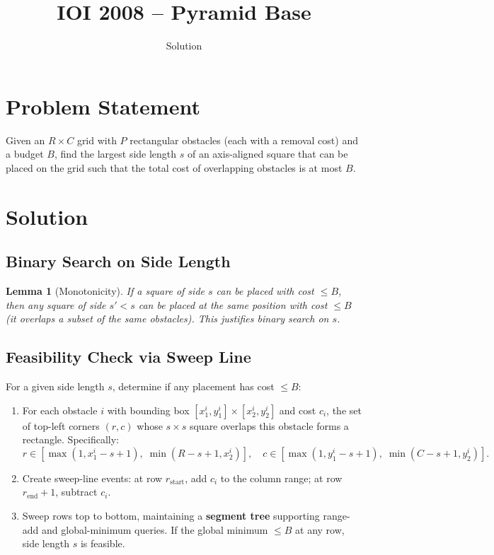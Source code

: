 \documentclass[11pt,a4paper]{article}
\title{IOI 2008 -- Pyramid Base}
\author{Solution}
\date{}
\newtheorem{lemma}[theorem]{Lemma}
\begin{document}
\maketitle

\section{Problem Statement}
Given an $R \times C$ grid with $P$ rectangular obstacles (each with a removal cost) and a budget $B$, find the largest side length $s$ of an axis-aligned square that can be placed on the grid such that the total cost of overlapping obstacles is at most $B$.

\section{Solution}

\subsection{Binary Search on Side Length}
\begin{lemma}[Monotonicity]
If a square of side $s$ can be placed with cost $\le B$, then any square of side $s' < s$ can be placed at the same position with cost $\le B$ (it overlaps a subset of the same obstacles). This justifies binary search on $s$.
\end{lemma}

\subsection{Feasibility Check via Sweep Line}
For a given side length $s$, determine if any placement has cost $\le B$:
\begin{enumerate}
    \item For each obstacle $i$ with bounding box $[x_1^i, y_1^i] \times [x_2^i, y_2^i]$ and cost $c_i$, the set of top-left corners $(r, c)$ whose $s \times s$ square overlaps this obstacle forms a rectangle. Specifically:
    \[
    r \in [\max(1, x_1^i - s + 1),\; \min(R - s + 1, x_2^i)], \quad
    c \in [\max(1, y_1^i - s + 1),\; \min(C - s + 1, y_2^i)].
    \]
    \item Create sweep-line events: at row $r_{\text{start}}$, add $c_i$ to the column range; at row $r_{\text{end}}+1$, subtract $c_i$.
    \item Sweep rows top to bottom, maintaining a \textbf{segment tree} supporting range-add and global-minimum queries. If the global minimum $\le B$ at any row, side length $s$ is feasible.
\end{enumerate}
\end{document}
